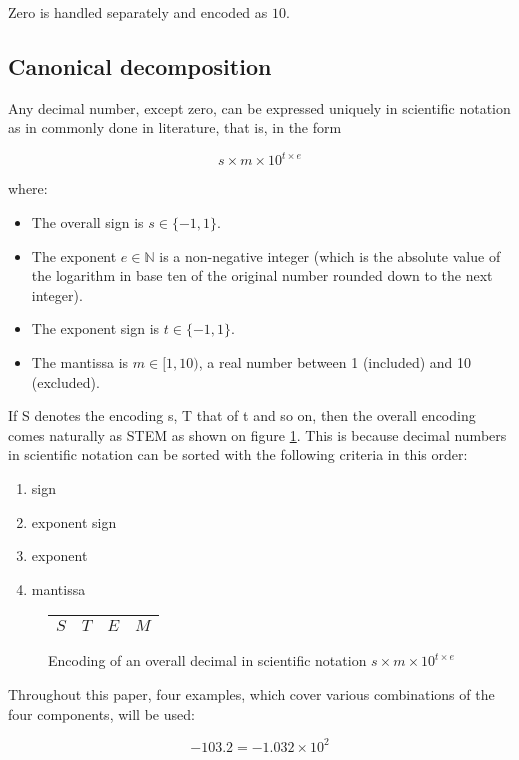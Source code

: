 \documentclass{acm_proc_article-sp}
\begin{document}
Zero is handled separately and encoded as $10$.

\subsection{Canonical decomposition}

Any decimal number, except zero, can be expressed uniquely in scientific notation as in commonly done in literature, that is, in the form

$$s\times m \times10^{t\times e}$$

where:

\begin{itemize}
\item The overall sign is $s\in \{-1, 1\}$.
\item The exponent $e\in \mathbb{N}$ is a non-negative integer (which is the absolute value of the logarithm in base ten of the original number rounded down to the next integer).
\item The exponent sign is $t\in \{-1, 1\}$.
\item The mantissa is $m\in [1,10)$, a real number between 1 (included) and 10 (excluded).
\end{itemize}

If S denotes the encoding s, T that of t and so on, then the overall encoding comes naturally as STEM as shown on figure \ref{figure-overall-encoding}. This is because decimal numbers in scientific notation can be sorted with the following criteria in this order:
\begin{enumerate}
\item sign
\item exponent sign
\item exponent
\item mantissa
\end{enumerate}

\begin{figure}
\caption{Encoding of an overall decimal in scientific notation $s\times m \times10^{t\times e}$}
\label{figure-overall-encoding}
\center
\begin{tabular}{|l|l|l|l|}
\hline
$S$ & $T$ & $E$ & $M$ \\
\hline
\end{tabular}
\end{figure}

Throughout this paper, four examples, which cover various combinations of the four components, will be used:

$$-103.2 = - 1.032 \times 10^2$$
\end{document}
